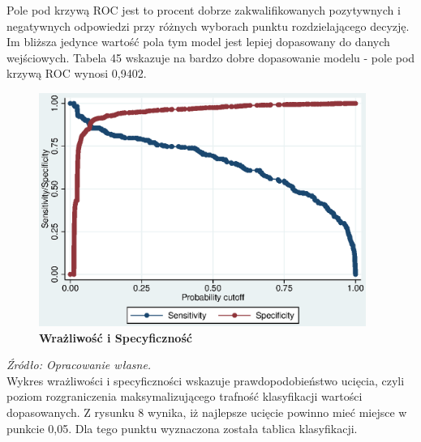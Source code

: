 Pole pod krzywą ROC jest to procent dobrze zakwalifikowanych pozytywnych i negatywnych odpowiedzi przy różnych wyborach punktu rozdzielającego decyzję. Im bliższa jedynce wartość pola tym model jest lepiej dopasowany do danych wejściowych. Tabela 45 wskazuje na bardzo dobre dopasowanie modelu - pole pod krzywą ROC wynosi 0,9402.

\vspace{0.5cm}
\begin{figure}[h]
\begin{centering}
  \includegraphics[height=3in]{Rysunki//SENS2}
    \caption{\textbf{Wrażliwość i Specyficzność}}
\end{centering}
\end{figure}
\textit{\footnotesize{Źródło: Opracowanie własne.}} \\

Wykres wrażliwości i specyficzności wskazuje prawdopodobieństwo ucięcia, czyli poziom rozgraniczenia maksymalizującego trafność klasyfikacji wartości dopasowanych. Z rysunku 8 wynika, iż najlepsze ucięcie powinno mieć miejsce w punkcie 0,05. Dla tego punktu wyznaczona została tablica klasyfikacji.

